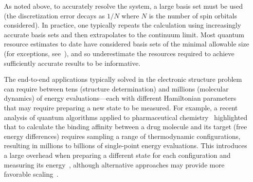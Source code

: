 \begin{refsection}
As noted above, to accurately resolve the system, a large basis set must be used (the discretization error decays as $1/N$ where $N$ is the number of spin orbitals considered). In practice, one typically repeats the calculation using increasingly accurate basis sets and then extrapolates to the continuum limit. Most quantum resource estimates to date have considered basis sets of the minimal allowable size (for exceptions, see~\cite{kim2022FaultTolerantQuantumChemicalSimulationsLiIon,su2021FaultTolerantChemistryFirstQuantized,elfving2020HowQuantumComputationalAdvantageChemistry,mcardle2022ExploitingFermionNumber,delgado2022SimulateLiIonBattery,shokrianZini2023BatteryMaterials,rubin2023MaterialsSim, rubin2023FusionDynamics}), and so underestimate the resources required to achieve sufficiently accurate results to be informative.

The end-to-end applications typically solved in the electronic structure problem can require between tens (structure determination) and millions (molecular dynamics) of energy evaluations---each with different Hamiltonian parameters that may require preparing a new state to be measured. For example, a recent analysis of quantum algorithms applied to pharmaceutical chemistry~\cite{santagati2023DrugDesign} highlighted that to calculate the binding affinity between a drug molecule and its target (free energy differences) requires sampling a range of thermodynamic configurations, resulting in millions to billions of single-point energy evaluations. This introduces a large overhead when preparing a different state for each configuration and measuring its energy~\cite{obrien2022MolecularForces}, although alternative approaches may provide more favorable scaling~\cite{simon2023MolecularDynamics}.





\end{refsection}
